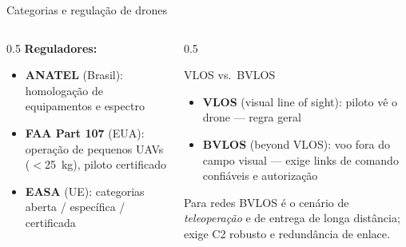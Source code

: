 \documentclass[aspectratio=169,11pt]{beamer}
\begin{document}
\begin{frame}{Categorias e regulação de drones}
  \begin{columns}
    \begin{column}{0.5\textwidth}
      \textbf{Reguladores:}
      \begin{itemize}
        \item \textbf{ANATEL} (Brasil): homologação de equipamentos e espectro
        \item \textbf{FAA Part 107} (EUA): operação de pequenos UAVs ($<$25~kg), piloto certificado
        \item \textbf{EASA} (UE): categorias aberta / específica / certificada
      \end{itemize}
    \end{column}
    \begin{column}{0.5\textwidth}
      \begin{block}{VLOS vs.\ BVLOS}
        \begin{itemize}
          \item \textbf{VLOS} (visual line of sight): piloto vê o drone --- regra geral
          \item \textbf{BVLOS} (beyond VLOS): voo fora do campo visual --- exige links de comando confiáveis e autorização
        \end{itemize}
      \end{block}
      \begin{alertblock}{Para redes}
        BVLOS é o cenário de \emph{teleoperação} e de entrega de longa distância; exige C2 robusto e redundância de enlace.
      \end{alertblock}
    \end{column}
  \end{columns}
\end{frame}
\end{document}
